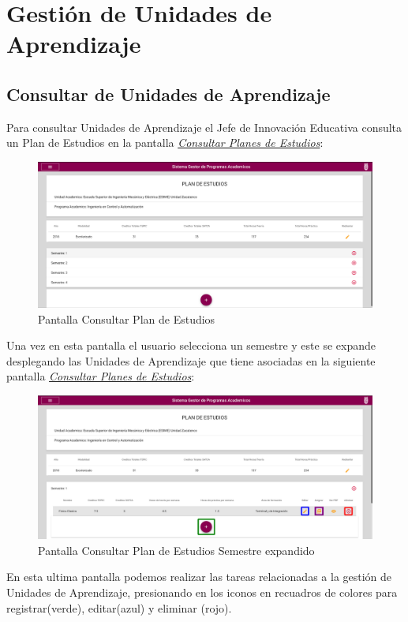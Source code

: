 \chapter{Gestión de Unidades de Aprendizaje}
\section{Consultar de Unidades de Aprendizaje}
Para consultar Unidades de Aprendizaje el Jefe de Innovación Educativa consulta un Plan de Estudios en la pantalla \hyperlink{consultarS}{\textit{Consultar Planes de Estudios}}:\\
\begin{figure}[!hbtp]
    \centering
    \hypertarget{consultarS}{\includegraphics[width=0.7\linewidth]{images/GUA/consultarS}}
    \caption{Pantalla Consultar Plan de Estudios}
    \label{consultarS}
\end{figure}
Una vez en esta pantalla el usuario selecciona un semestre y este se expande desplegando las Unidades de Aprendizaje que tiene asociadas en la siguiente pantalla \hyperlink{consultarUA}{\textit{Consultar Planes de Estudios}}:\\
\begin{figure}[!hbtp]
    \centering
    \hypertarget{consultarUA}{\includegraphics[width=0.7\linewidth]{images/GUA/consultarUA}}
    \caption{Pantalla Consultar Plan de Estudios Semestre expandido}
    \label{consultarUA}
\end{figure}
En esta ultima pantalla podemos realizar las tareas relacionadas a la gestión de Unidades de Aprendizaje, presionando en los iconos en recuadros de colores para registrar(verde), editar(azul) y eliminar (rojo).
\newpage
